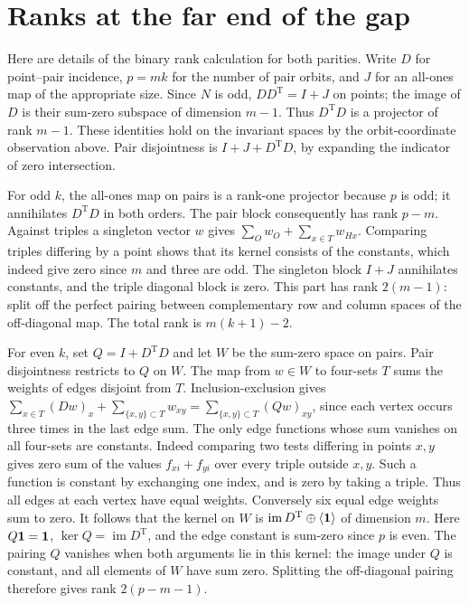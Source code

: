 \documentclass[11pt]{article}
\newcommand{\im}{\operatorname{im}}
\begin{document}
\section{Ranks at the far end of the gap}
Here are details of the binary rank calculation for both parities.
Write \(D\) for point--pair incidence, \(p=mk\) for the number of pair
orbits, and \(J\) for an all-ones map of the appropriate size.
Since \(N\) is odd, \(DD^{\mathrm T}=I+J\) on points; the image of \(D\)
is their sum-zero subspace of dimension \(m-1\). Thus \(D^{\mathrm T}D\)
is a projector of rank \(m-1\). These identities hold on the invariant
spaces by the orbit-coordinate observation above. Pair disjointness is
\(I+J+D^{\mathrm T}D\), by expanding the indicator of zero intersection.

For odd \(k\), the all-ones map on pairs is a rank-one projector because
\(p\) is odd; it annihilates \(D^{\mathrm T}D\) in both orders. The
pair block consequently has rank \(p-m\). Against triples a singleton
vector \(w\) gives \(\sum_O w_O+\sum_{x\in T}w_{Hx}\). Comparing triples
differing by a point shows that its kernel consists of the constants,
which indeed give zero since \(m\) and three are odd. The singleton
block \(I+J\) annihilates constants, and the triple diagonal block is
zero. This part has rank \(2(m-1)\): split off the perfect pairing
between complementary row and column spaces of the off-diagonal map.
The total rank is \(m(k+1)-2\).

For even \(k\), set \(Q=I+D^{\mathrm T}D\) and let \(W\) be the
sum-zero space on pairs. Pair disjointness restricts to \(Q\) on \(W\).
The map from \(w\in W\) to four-sets \(T\) sums the weights of edges
disjoint from \(T\). Inclusion-exclusion gives
\(\sum_{x\in T}(Dw)_x+\sum_{\{x,y\}\subset T} w_{xy}
=\sum_{\{x,y\}\subset T}(Qw)_{xy}\), since each vertex occurs three
times in the last edge sum. The only edge functions whose sum vanishes
on all four-sets are constants. Indeed comparing two tests differing
in points \(x,y\) gives zero sum of the values \(f_{xi}+f_{yi}\) over
every triple outside \(x,y\). Such a function is constant by exchanging
one index, and is zero by taking a triple. Thus all edges at each
vertex have equal weights. Conversely six equal edge weights sum to zero.
It follows that the kernel on \(W\) is
\(\im D^{\mathrm T}\oplus\langle{\bf1}\rangle\) of dimension \(m\).
Here \(Q{\bf1}={\bf1}\), \(\ker Q=\im D^{\mathrm T}\), and the
edge constant is sum-zero since \(p\) is even. The pairing \(Q\)
vanishes when both arguments lie in this kernel: the image under \(Q\)
is constant, and all elements of \(W\) have sum zero.
Splitting the off-diagonal pairing therefore gives
rank \(2(p-m-1)\).
\end{document}

